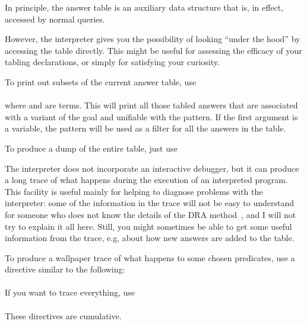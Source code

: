 %

In principle, the answer table is an auxiliary data structure that is, in
effect, accessed by normal queries.

However, the interpreter gives you the possibility of looking ``under the
hood'' by accessing the table directly.  This might be useful for assessing
the efficacy of your tabling declarations, or simply for satisfying your
curiosity.

To print out subsets of the current answer table, use\\
\ind{}%
\label{dir:answers}\\
where  and  are terms.
This will print all those tabled answers that are associated with a variant
of the goal and unifiable with the pattern.  If the first argument is a
variable, the pattern will be used as a filter for all the answers in the
table.

To produce a dump of the entire table, just use\\
\ind{}




The interpreter does not incorporate an interactive debugger, but it can
produce a long trace of what happens during the execution of an interpreted
program.  This facility is useful mainly for helping to diagnose problems
with the interpreter: some of the information in the trace will not be easy
to understand for someone who does not know the details of the DRA
method~\cite{guo-gupta-dra}, and I will not try to explain it all here.
Still, you might sometimes be able to get some useful information from the
trace, e.g, about how new answers are added to the table.

To produce a wallpaper trace of what happens to some chosen predicates, use a
directive similar to the following:\\
\ind{}\label{dir:trace}\\
If you want to trace everything, use\\
\ind{}\\
These directives are cumulative.


